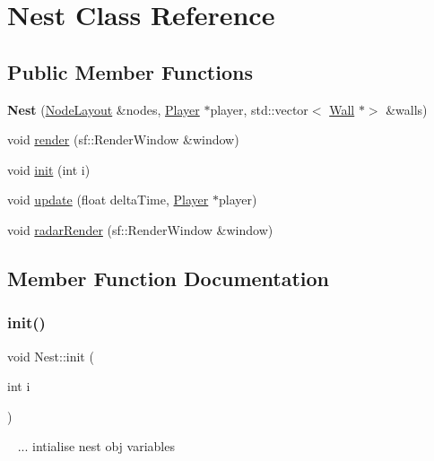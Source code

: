 \hypertarget{class_nest}{}\section{Nest Class Reference}
\label{class_nest}
\subsection*{Public Member Functions}
\begin{DoxyCompactItemize}
\item 
\mbox{\label{class_nest_a316201617cb7b9fa85e30d350ab180d1}} 
{\bfseries Nest} (\mbox{\hyperlink{class_node_layout}{Node\+Layout}} \&nodes, \mbox{\hyperlink{class_player}{Player}} $\ast$player, std\+::vector$<$ \mbox{\hyperlink{class_wall}{Wall}} $\ast$$>$ \&walls)
\item 
void \mbox{\hyperlink{class_nest_a09d907a3d411da0249c7d0bb5ad7b36c}{render}} (sf\+::\+Render\+Window \&window)
\item 
void \mbox{\hyperlink{class_nest_a9af26a97505ef6ab8a0113ae6e9ddc8e}{init}} (int i)
\item 
void \mbox{\hyperlink{class_nest_a8f402fb76539074b694158a47aafe002}{update}} (float delta\+Time, \mbox{\hyperlink{class_player}{Player}} $\ast$player)
\item 
void \mbox{\hyperlink{class_nest_a01eff531c62869fdf9d41b0aea69e45f}{radar\+Render}} (sf\+::\+Render\+Window \&window)
\end{DoxyCompactItemize}


\subsection{Member Function Documentation}
\mbox{\label{class_nest_a9af26a97505ef6ab8a0113ae6e9ddc8e}} 
\subsubsection{\texorpdfstring{init()}{init()}}
{\footnotesize\ttfamily void Nest\+::init (\begin{DoxyParamCaption}\item[{int}]{i }\end{DoxyParamCaption})}

~\newline
... intialise nest obj variables\mbox{\label{class_nest_a01eff531c62869fdf9d41b0aea69e45f}} 
